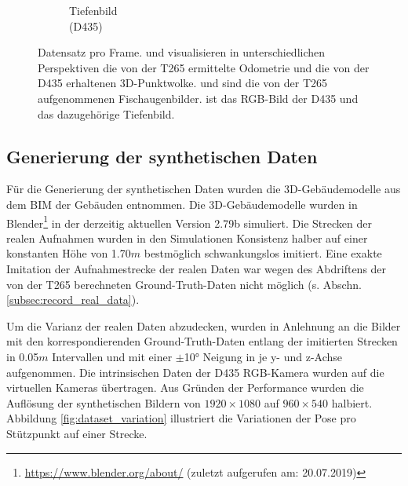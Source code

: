 \begin{figure}
\begin{subfigure}[t]{0.3\linewidth}
		\caption{Tiefenbild \\ (D435) \hspace*{2cm}}
		\label{subfig:depth-image}
	\end{subfigure}
	\caption{Datensatz pro Frame.  und  visualisieren in unterschiedlichen Perspektiven die von der T265 ermittelte Odometrie und die von der D435 erhaltenen 3D-Punktwolke.  und  sind die von der T265 aufgenommenen Fischaugenbilder.  ist das RGB-Bild der D435 und  das dazugehörige Tiefenbild. }
	\label{fig:dataset}
\end{figure}

\subsection{Generierung der synthetischen Daten}
\label{subsec:generate_synth_images}
Für die Generierung der synthetischen Daten wurden die 3D-Gebäudemodelle aus dem BIM der Gebäuden entnommen. Die 3D-Gebäudemodelle wurden in Blender\footnote{\url{https://www.blender.org/about/} (zuletzt aufgerufen am: 20.07.2019)} in der derzeitig aktuellen Version 2.79b simuliert. Die Strecken der realen Aufnahmen wurden in den Simulationen Konsistenz halber auf einer konstanten Höhe von 1.70$m$ bestmöglich schwankungslos imitiert. Eine exakte Imitation der Aufnahmestrecke der realen Daten war wegen des Abdriftens der von der T265 berechneten Ground-Truth-Daten nicht möglich (s. Abschn. \ref{subsec:record_real_data}).

Um die Varianz der realen Daten abzudecken, wurden in Anlehnung an \citet{acharyaBIMPoseNetIndoorCamera2019} die Bilder mit den korrespondierenden Ground-Truth-Daten entlang der imitierten Strecken in 0.05$m$ Intervallen und mit einer $\pm$10° Neigung in je y- und z-Achse aufgenommen. Die intrinsischen Daten der D435 RGB-Kamera wurden auf die virtuellen Kameras übertragen. Aus Gründen der Performance wurden die Auflösung der synthetischen Bildern von $1920\times1080$ auf $960\times540$ halbiert. Abbildung \ref{fig:dataset_variation} illustriert die Variationen der Pose pro Stützpunkt auf einer Strecke.


